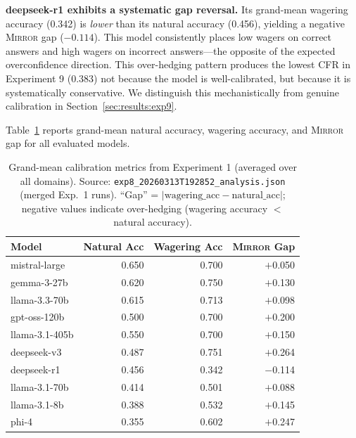 \documentclass[10pt]{article}
\newcommand{\mirror}{\textsc{Mirror}}
\newcommand{\CFR}{CFR}
\begin{document}
\textbf{deepseek-r1 exhibits a systematic gap reversal.} Its grand-mean wagering
accuracy (0.342) is \textit{lower} than its natural accuracy (0.456), yielding a
negative \mirror{} gap ($-0.114$). This model consistently places low wagers on correct
answers and high wagers on incorrect answers---the opposite of the expected overconfidence
direction. This over-hedging pattern produces the lowest \CFR{} in Experiment 9 (0.383)
not because the model is well-calibrated, but because it is systematically conservative.
We distinguish this mechanistically from genuine calibration in Section~\ref{sec:results:exp9}.

Table~\ref{tab:exp1_grand_means} reports grand-mean natural accuracy, wagering accuracy,
and \mirror{} gap for all evaluated models.

\begin{table}[t]
  \centering
  \caption{Grand-mean calibration metrics from Experiment 1 (averaged over all domains).
    Source: \texttt{exp8\_20260313T192852\_analysis.json} (merged Exp.~1 runs).
    ``Gap'' = $|\text{wagering\_acc} - \text{natural\_acc}|$; negative values indicate
    over-hedging (wagering accuracy $<$ natural accuracy).}
  \label{tab:exp1_grand_means}
  \small
  \begin{tabular}{lrrr}
    \toprule
    Model              & Natural Acc & Wagering Acc & \mirror{} Gap \\
    \midrule
    mistral-large      & 0.650       & 0.700        & $+$0.050 \\
    gemma-3-27b        & 0.620       & 0.750        & $+$0.130 \\
    llama-3.3-70b      & 0.615       & 0.713        & $+$0.098 \\
    gpt-oss-120b       & 0.500       & 0.700        & $+$0.200 \\
    llama-3.1-405b     & 0.550       & 0.700        & $+$0.150 \\
    deepseek-v3        & 0.487       & 0.751        & $+$0.264 \\
    deepseek-r1        & 0.456       & 0.342        & $-$0.114 \\
    llama-3.1-70b      & 0.414       & 0.501        & $+$0.088 \\
    llama-3.1-8b       & 0.388       & 0.532        & $+$0.145 \\
    phi-4              & 0.355       & 0.602        & $+$0.247 \\
    \bottomrule
  \end{tabular}
\end{table}
\end{document}

